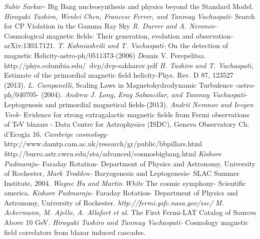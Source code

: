 \documentclass[floatfix,aps,prd,amsmath,amssymb]{revtex4}
\begin{document}
\begin{thebibliography}{10}
\emph {Subir Sarkar-}
Big Bang nucleosynthesis and physics beyond the Standard Model.
\emph {Hiroyuki Tashiro, Wenlei Chen, Francesc Ferrer, and Tanmay Vachaspati-}
Search for CP Violation in the Gamma Ray Sky
\emph {R. Durrer and A. Neronov-}
Cosmological magnetic fields: Their generation, evolution and observation- arXiv:1303.7121.
\emph {T. Kahniashvili and T. Vachaspati-}
On the detection of magnetic Helicity-astro-ph/0511373-(2006)
\emph Dennis V. Perepelitsa.
http://phys.columbia.edu/~dvp/dvp-sakharov.pdf
\emph {H. Tashiro and T. Vachaspati,}
Estimate of the primordial magnetic field helicity-Phys. Rev. D 87, 123527 (2013).
\emph {L. Campanelli, }
Scaling Laws in Magnetohydrodynamic Turbulence -astro-ph/040705- (2004).
\emph {Andrew J. Long, Eray Sabancilar, and Tanmay Vachaspati-}
Leptogenesis and primordial magnetical fields-(2013).
\emph {Andrii Neronov and Ievgen Vovk-}
Evidence for strong extragalactic magnetic fields from Fermi observations of TeV blazars - Data Centre for Astrophysics (ISDC), Geneva Observatory Ch. d'Ecogia 16.
\emph {Cambrige cosmology-}
http://www.damtp.cam.ac.uk/research/gr/public/bb\textunderscore pillars.html
\emph http://burro.astr.cwru.edu/stu/advanced/cosmos\textunderscore bigbang.html
\emph {Kishore Padmaraju-}
Faraday Rotation- Department of Physics and Astronomy, University of Rochester,
\emph {Mark Trodden-}
Baryogenesis and Leptogenesis- SLAC Summer Institute, 2004.
\emph {Wayne Hu and Martin White}
The cosmic symphony- Scientific america.
\emph {Kishore Padmaraju-}
Faraday Rotation- Department of Physics and Astronomy, University of Rochester.
\emph {http://fermi.gsfc.nasa.gov/ssc/}
\emph {M. Ackermann, M. Ajello, A. Allafort et al.}
The First Fermi-LAT Catalog of Sources Above 10 GeV.
\emph{Hiroyuki Tashiro and Tanmay Vachaspati-} Cosmology magnetic field correlators from blazar induced cascades.

\end{thebibliography}
\end{document}
